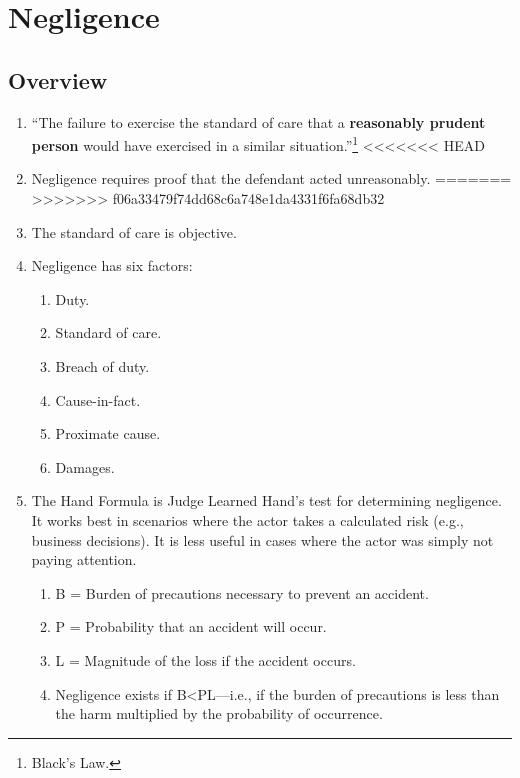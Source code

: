 \section{Negligence}

\subsection{Overview}

\begin{enumerate}
    \item ``The failure to exercise the standard of care that a \textbf{reasonably prudent person} would have exercised in a similar situation.''\footnote{Black's Law.}
<<<<<<< HEAD
    \item Negligence requires proof that the defendant acted unreasonably.
=======
>>>>>>> f06a33479f74dd68c6a748e1da4331f6fa68db32
    \item The standard of care is objective.
    \item Negligence has six factors:
    \begin{enumerate}
        \item Duty.
        \item Standard of care.
        \item Breach of duty.
        \item Cause-in-fact.
        \item Proximate cause.
        \item Damages.
    \end{enumerate}
    \item The Hand Formula is Judge Learned Hand's test for determining negligence. It works best in scenarios where the actor takes a calculated risk (e.g., business decisions). It is less useful in cases where the actor was simply not paying attention.
    \begin{enumerate}
        \item B = Burden of precautions necessary to prevent an accident.
        \item P = Probability that an accident will occur.
        \item L = Magnitude of the loss if the accident occurs.
        \item Negligence exists if B\textless PL---i.e., if the burden of precautions is less than the harm multiplied by the probability of occurrence.
    \end{enumerate}
\end{enumerate}

